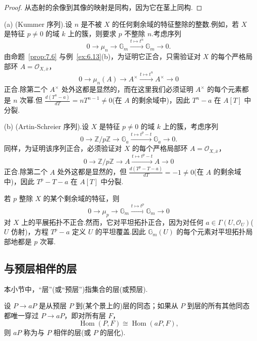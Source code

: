 \begin{proof}
从态射的余像到其像的映射是同构，因为它在茎上同构.
\end{proof}

\begin{example}\label{ex:7.9}
(a) (Kummer 序列).设 $n$ 是不被 $X$ 的任何剩余域的特征整除的整数.例如，若 $X$ 是特征 $p \neq 0$ 的域 $k$ 上的簇，则要求 $p$ 不整除 $n$.考虑序列
\[
0 \to \mu_n \to \mathbb{G}_{m} \xrightarrow{t \mapsto t^{n}} \mathbb{G}_{m} \to 0.
\]
由命题~\ref{prop:7.6} 与例~\ref{ex:6.13}(b)，为证明它正合，只需验证对 $X$ 的每个严格局部环 $A = \mathcal{O}_{X, \bar{x}}$，
\[
0 \to \mu_n(A) \to A^{\times} \xrightarrow{t \mapsto t^{n}} A^{\times} \to 0
\]
正合.除第二个 $A^{\times}$ 处外这都是显然的，而在这里我们必须证明 $A^{\times}$ 的每个元素都是 $n$ 次幂.但 $\frac{d(T^{n} - a)}{dT} = nT^{n-1} \neq 0$(在 $A$ 的剩余域中)，因此 $T^{n} - a$ 在 $A[T]$ 中分裂.

(b) (Artin-Schreier 序列).设 $X$ 是特征 $p \neq 0$ 的域 $k$ 上的簇，考虑序列
\[
0 \to \mathbb{Z}/p\mathbb{Z} \to \mathbb{G}_{a} \xrightarrow{t \mapsto t^{p} - t} \mathbb{G}_{a} \to 0.
\]
同样，为证明该序列正合，必须验证对 $X$ 的每个严格局部环 $A = \mathcal{O}_{X, \bar{x}}$，
\[
0 \to \mathbb{Z}/p\mathbb{Z} \to A \xrightarrow{t \mapsto t^{p} - t} A \to 0
\]
正合.除第二个 $A$ 处外这都是显然的，但 $\frac{d(T^{p} - T - a)}{dT} = -1 \neq 0$(在 $A$ 的剩余域中)，因此 $T^{p} - T - a$ 在 $A[T]$ 中分裂.
\end{example}

\begin{remark}\label{rem:7.10}
若 $p$ 整除 $X$ 的某个剩余域的特征，则
\[
0 \to \mu_p \to \mathbb{G}_{m} \xrightarrow{t \mapsto t^{p}} \mathbb{G}_{m} \to 0
\]
对 $X$ 上的平展拓扑不正合.然而，它对平坦拓扑正合，因为对任何 $a \in \Gamma(U, \mathcal{O}_U)$($U$ 仿射)，方程 $T^{p} - a$ 定义 $U$ 的平坦覆盖.因此 $\mathbb{G}_{m}(U)$ 的每个元素对平坦拓扑局部地都是 $p$ 次幂.
\end{remark}

\subsection*{与预层相伴的层}

本小节中，``层''(或``预层'')指集合的层(或预层).

\begin{definition}\label{def:7.11}
设 $P \to aP$ 是从预层 $P$ 到(某个景上的)层的同态；如果从 $P$ 到层的所有其他同态都唯一穿过 $P \to aP$，即对所有层 $F$，
\[
\operatorname{Hom}(P, F) \cong \operatorname{Hom}(aP, F),
\]
则 $aP$ 称为与 $P$ 相伴的层(或 $P$ 的层化).
\end{definition}

